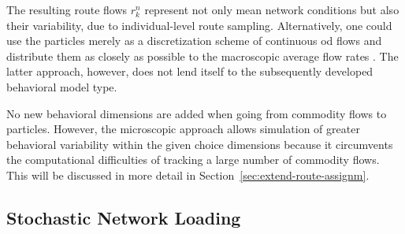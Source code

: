 %
%
%
%

The resulting route flows $r_k^{n}$
represent not only mean network conditions\corr{,}{}
but also their variability, due to  individual-level
route sampling.
Alternatively, one could use the particles merely as a 
discretization scheme of continuous
\gls{od} flows and distribute them as closely as possible to the
macroscopic average flow rates \citep[e.g.,][]{zhang-2008}.
The latter approach, however, does not lend itself to
the subsequently developed behavioral model type.


No new behavioral dimensions are added when going from commodity
flows to particles. However, the microscopic approach allows
simulation of greater behavioral variability within the given
choice dimensions because it circumvents the computational
difficulties of tracking a large number of commodity flows.  This will
be discussed in more detail in Section~\ref{sec:extend-route-assignm}.


\subsection{Stochastic Network Loading}
\label{sec:stoch-netw-load}

